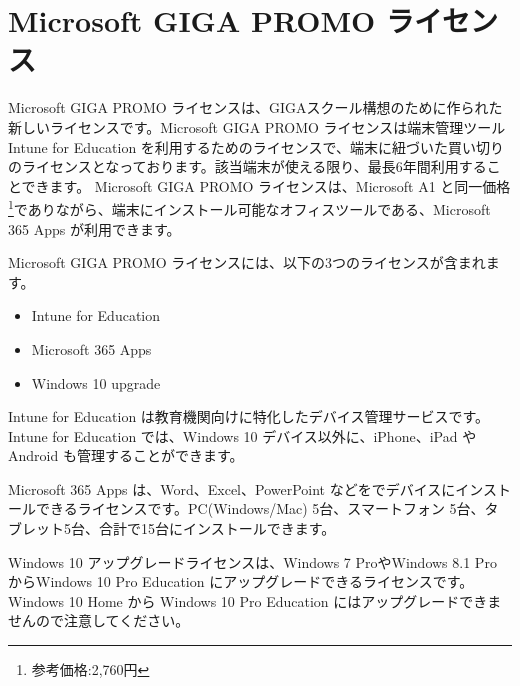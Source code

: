 \section{Microsoft GIGA PROMO ライセンス}

Microsoft GIGA PROMO ライセンスは、GIGAスクール構想のために作られた新しいライセンスです。Microsoft GIGA PROMO ライセンスは端末管理ツール Intune for Education を利用するためのライセンスで、端末に紐づいた買い切りのライセンスとなっております。該当端末が使える限り、最長6年間利用することできます。
Microsoft GIGA PROMO ライセンスは、Microsoft A1 と同一価格\footnote{参考価格:2,760円}でありながら、端末にインストール可能なオフィスツールである、Microsoft 365 Apps が利用できます。

Microsoft GIGA PROMO ライセンスには、以下の3つのライセンスが含まれます。

\begin{itemize}
    \item Intune for Education
    \item Microsoft 365 Apps
    \item Windows 10 upgrade
\end{itemize}

Intune for Education は教育機関向けに特化したデバイス管理サービスです。Intune for Education では、Windows 10 デバイス以外に、iPhone、iPad や Android も管理することができます。

Microsoft 365 Apps は、Word、Excel、PowerPoint などをでデバイスにインストールできるライセンスです。PC(Windows/Mac) 5台、スマートフォン 5台、タブレット5台、合計で15台にインストールできます。

Windows 10 アップグレードライセンスは、Windows 7 ProやWindows 8.1 Pro からWindows 10 Pro Education にアップグレードできるライセンスです。Windows 10 Home から Windows 10 Pro Education にはアップグレードできませんので注意してください。